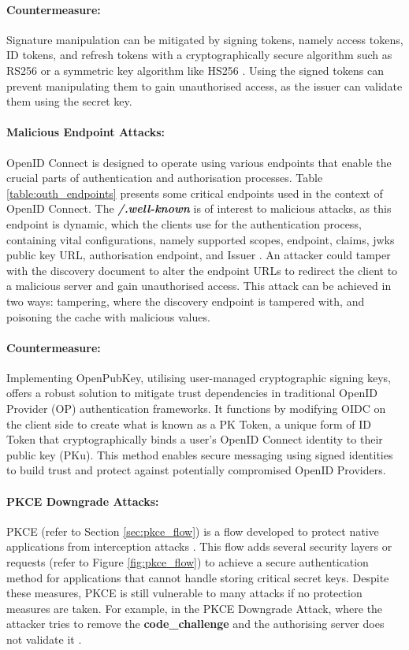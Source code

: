     \paragraph{Countermeasure:} Signature manipulation can be mitigated by signing tokens, namely access tokens, ID tokens, and refresh tokens with a cryptographically 
    secure algorithm such as RS256 or a symmetric key algorithm like HS256 \citep{signed_token}. Using the signed tokens can prevent manipulating them to gain unauthorised access, as the issuer can validate them using the secret key.
    
    \paragraph{Malicious Endpoint Attacks:} OpenID Connect is designed to operate using various endpoints that enable the crucial parts of authentication and authorisation processes.
    Table \ref{table:outh_endpoints} presents some critical endpoints used in the context of OpenID Connect.
    The \textbf{\textit{/.well-known}} is of interest to malicious attacks, as this endpoint is dynamic, which the clients use for the authentication process, containing vital configurations, namely supported scopes, endpoint, claims, jwks public key URL, authorisation endpoint, and Issuer \citep{oidc_attacks}.
    An attacker could tamper with the discovery document to alter the endpoint URLs to redirect the client to a malicious server and gain unauthorised access.
    This attack can be achieved in two ways: tampering, where the discovery endpoint is tampered with, and poisoning the cache with malicious values.

    \paragraph{Countermeasure:} Implementing OpenPubKey, utilising user-managed cryptographic signing keys, offers a robust solution to mitigate trust dependencies in traditional OpenID Provider (OP) authentication frameworks.  It functions by modifying OIDC on the client side to create what is known as a PK Token, a unique form of ID Token that cryptographically binds a user's OpenID Connect identity to their public key (PKu)\citep{openpub_key}. This method enables secure messaging using signed identities to build trust and protect against potentially compromised OpenID Providers.


    \paragraph{PKCE Downgrade Attacks:} PKCE (refer to Section \ref{sec:pkce_flow}) is a flow developed to protect native applications from interception attacks \citep{pkce}. This flow adds several security layers or requests (refer to Figure \ref{fig:pkce_flow}) to achieve a secure authentication method for applications that cannot handle storing critical secret keys. Despite these measures, PKCE is still vulnerable to many attacks if no protection measures are taken. For example, in the PKCE Downgrade Attack, where the attacker tries to remove the \textbf{code\_challenge} and the authorising server does not validate it \citep{oidc_attacks}.

